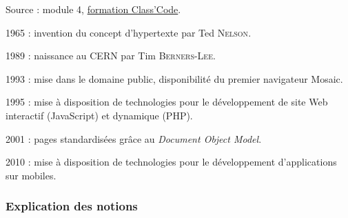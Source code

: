 \noindent Source : module 4, \href{https://pixees.fr/classcode/formations/module4/}{formation Class'Code}.



\begin{tcolorbox}[title={Repères historiques}, toprule=0pt, leftrule=0pt, rightrule=0pt, arc=0pt,
                  fonttitle=\scshape\boxtitlefont,
                  colbacktitle=white, coltitle=firstcolor, colframe=firstcolor, colback=firstcolor!10,
                  breakable, enhanced jigsaw]
\begin{jazzitemize}
\item 1965 : invention du concept d’hypertexte par Ted \textsc{Nelson}.
\item 1989 : naissance au CERN par Tim \textsc{Berners-Lee}.
\item 1993 : mise dans le domaine public, disponibilité du premier navigateur Mosaic.
\item 1995 : mise à disposition de technologies pour le développement de site Web interactif (JavaScript) et dynamique (PHP).
\item 2001 : pages standardisées grâce au \textit{Document Object Model}.
\item 2010 : mise à disposition de technologies pour le développement  d’applications sur mobiles.
\end{jazzitemize}
\end{tcolorbox}

\subsubsection[Explication des notions]{Explication des notions}
\label{subsub:IX.2.1.3}


